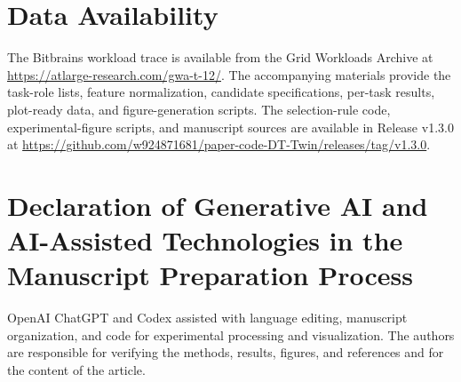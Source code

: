 \documentclass[a4paper,fleqn]{cas-sc}
\begin{document}
\section*{Data Availability}
The Bitbrains workload trace is available from the Grid Workloads Archive
at \url{https://atlarge-research.com/gwa-t-12/}. The accompanying materials
provide the task-role lists, feature normalization, candidate specifications,
per-task results, plot-ready data, and figure-generation scripts.
The selection-rule code, experimental-figure scripts, and manuscript sources
are available in Release v1.3.0 at
\url{https://github.com/w924871681/paper-code-DT-Twin/releases/tag/v1.3.0}.

\section*{Declaration of Generative AI and AI-Assisted Technologies
in the Manuscript Preparation Process}
OpenAI ChatGPT and Codex assisted with language editing, manuscript
organization, and code for experimental processing and visualization.
The authors are responsible for verifying the methods, results, figures,
and references and for the content of the article.
\end{document}
